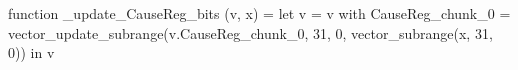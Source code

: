 function _update_CauseReg_bits (v, x) = let v = { v with CauseReg_chunk_0 = vector_update_subrange(v.CauseReg_chunk_0, 31, 0, vector_subrange(x, 31, 0)) } in v
